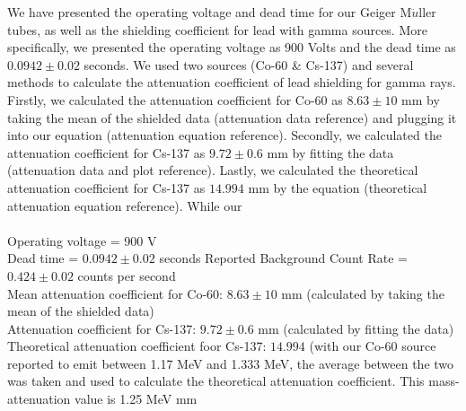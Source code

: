 We have presented the operating voltage and dead time for our Geiger M$\ddot{u}$ller tubes, as well as the shielding coefficient for lead with gamma sources. More specifically, we presented the operating voltage as $900$ Volts and the dead time as $0.0942 \pm 0.02$ seconds. We used two sources (Co-60 \& Cs-137) and several methods to calculate the attenuation coefficient of lead shielding for gamma rays. Firstly, we calculated the attenuation coefficient for Co-60 as $8.63 \pm 10$ mm by taking the mean of the shielded data (attenuation data reference) and plugging it into our equation (attenuation equation reference). Secondly, we calculated the attenuation coefficient for Cs-137 as $9.72 \pm 0.6$ mm by fitting the data (attenuation data and plot reference). Lastly, we calculated the theoretical attenuation coefficient for Cs-137 as $14.994$ mm by the equation (theoretical attenuation equation reference). While our 
\\ \\
Operating voltage = 900 V \\
Dead time = $0.0942 \pm 0.02$ seconds
Reported Background Count Rate  = $0.424 \pm 0.02$ counts per second \\ 
Mean attenuation coefficient for Co-60: $8.63 \pm 10$ mm (calculated by taking the mean of the shielded data) \\
Attenuation coefficient for Cs-137: $9.72 \pm 0.6$ mm (calculated by fitting the data) \\
Theoretical attenuation coefficient foor Cs-137: $14.994$ (with our Co-60 source reported to emit between 1.17 MeV and 1.333 MeV, the average between the two was taken and used to calculate the theoretical attenuation coefficient. This mass-attenuation value is 1.25 MeV mm